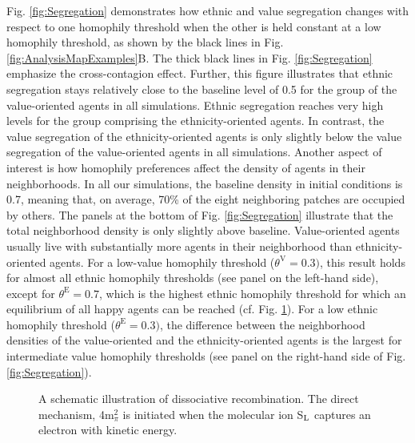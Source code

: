\documentclass{ws-acs}
\begin{document}
{Fig. \ref{fig:Segregation} demonstrates how ethnic and value segregation changes with respect to one homophily threshold when the other is held constant at a low homophily threshold, as shown by the black lines in Fig. \ref{fig:AnalysisMapExamples}B. The thick black lines in Fig. \ref{fig:Segregation} emphasize the cross-contagion effect. Further, this figure illustrates that ethnic segregation stays relatively close to the baseline level of 0.5 for the group of the value-oriented agents in all simulations. Ethnic segregation reaches very high levels for the group comprising the ethnicity-oriented agents. In contrast, the value segregation of the ethnicity-oriented agents is only slightly below the value segregation of the value-oriented agents in all simulations. Another aspect of interest is how homophily preferences affect the density of agents in their neighborhoods. In all our simulations, the baseline density in initial conditions is 0.7, meaning that, on average, 70\% of the eight neighboring patches are occupied by others. The panels at the bottom of Fig. \ref{fig:Segregation} illustrate that the total neighborhood density is only slightly above baseline. Value-oriented agents usually live with substantially more agents in their neighborhood than ethnicity-oriented agents. For a low-value homophily threshold ($\theta^\text{V}=0.3)$, this result holds for almost all ethnic homophily thresholds (see panel on the left-hand side), except for $\theta^\text{E}=0.7$, which is the highest ethnic homophily threshold for which an equilibrium of all happy agents can be reached (cf. Fig. \ref{fig:Heatmap}). For a low ethnic homophily threshold ($\theta^\text{E}=0.3)$, the difference between the neighborhood densities of the value-oriented and the ethnicity-oriented agents is the largest for intermediate value homophily thresholds (see panel on the right-hand side of Fig. \ref{fig:Segregation}).

\begin{figure}[th]
\centerline{}
\vspace*{8pt}
\caption{A schematic illustration of dissociative recombination. The
direct mechanism, 4m$^2_\pi$ is initiated when the molecular ion
S$_{\rm L}$ captures an electron with kinetic energy.}
\label{fig:Heatmap}
\end{figure}

}
\end{document}
